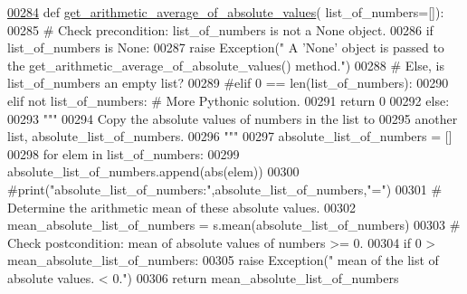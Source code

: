 \begin{DoxyCode}
\hypertarget{classstatistics_1_1data__analysis__tool_1_1data__analysis_l00284}{}\hyperlink{classstatistics_1_1data__analysis__tool_1_1data__analysis_a3eb98f0cd57564ad42dd8b2cef5feab5}{00284}     \textcolor{keyword}{def }\hyperlink{classstatistics_1_1data__analysis__tool_1_1data__analysis_a3eb98f0cd57564ad42dd8b2cef5feab5}{get\_arithmetic\_average\_of\_absolute\_values}(
      list\_of\_numbers=[]):
00285         \textcolor{comment}{# Check precondition: list\_of\_numbers is not a None object.}
00286         \textcolor{keywordflow}{if} list\_of\_numbers \textcolor{keywordflow}{is} \textcolor{keywordtype}{None}:
00287             \textcolor{keywordflow}{raise} Exception(\textcolor{stringliteral}{"   A 'None' object is passed to the
       get\_arithmetic\_average\_of\_absolute\_values() method."})
00288         \textcolor{comment}{# Else, is list\_of\_numbers an empty list?}
00289         \textcolor{comment}{#elif 0 == len(list\_of\_numbers):}
00290         \textcolor{keywordflow}{elif} \textcolor{keywordflow}{not} list\_of\_numbers:   \textcolor{comment}{# More Pythonic solution.}
00291             \textcolor{keywordflow}{return} 0
00292         \textcolor{keywordflow}{else}:
00293             \textcolor{stringliteral}{"""}
00294 \textcolor{stringliteral}{                Copy the absolute values of numbers in the list to}
00295 \textcolor{stringliteral}{                    another list, absolute\_list\_of\_numbers.}
00296 \textcolor{stringliteral}{            """}
00297             absolute\_list\_of\_numbers = []
00298             \textcolor{keywordflow}{for} elem \textcolor{keywordflow}{in} list\_of\_numbers:
00299                 absolute\_list\_of\_numbers.append(abs(elem))
00300             \textcolor{comment}{#print("absolute\_list\_of\_numbers:",absolute\_list\_of\_numbers,"=")}
00301             \textcolor{comment}{# Determine the arithmetic mean of these absolute values.}
00302             mean\_absolute\_list\_of\_numbers = s.mean(absolute\_list\_of\_numbers)
00303             \textcolor{comment}{# Check postcondition: mean of absolute values of numbers >= 0.}
00304             \textcolor{keywordflow}{if} 0 > mean\_absolute\_list\_of\_numbers:
00305                 \textcolor{keywordflow}{raise} Exception(\textcolor{stringliteral}{"   mean of the list of absolute values. < 0."})
00306             \textcolor{keywordflow}{return} mean\_absolute\_list\_of\_numbers
\end{DoxyCode}


